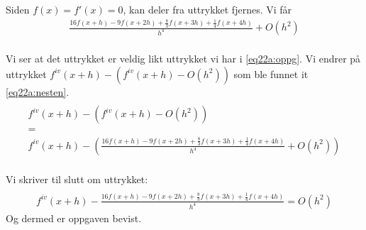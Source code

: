 
Siden $f(x) = f'(x) = 0$, kan deler fra uttrykket fjernes. Vi får
\begin{multline}
\frac{16f(x+h)-9f(x+2h)+\frac{8}{3}f(x+3h)+\frac{1}{4}f(x+4h)}{h^4}+O(h^2) \label{eq22a:nesten} \\
\end{multline}

Vi ser at det uttrykket er veldig likt uttrykket vi har i \ref{eq22a:oppg}. Vi endrer på uttrykket ${f^{iv}}(x + h) - ({f^{iv}}(x + h) - O(h^2))$ som ble funnet it \ref{eq22a:nesten}. 
\begin{multline}
\\ {f^{iv}}(x + h) - ({f^{iv}}(x + h) - O(h^2))  \\
= \\
{f^{iv}}(x + h) - (\frac{16f(x+h)-9f(x+2h)+\frac{8}{3}f(x+3h)+\frac{1}{4}f(x+4h)}{h^4}+O(h^2)) \\ \nonumber
\end{multline}


Vi skriver til slutt om uttrykket:
\begin{multline}
\\ {f^{iv}}(x + h) - \frac{16f(x+h)-9f(x+2h)+\frac{8}{3}f(x+3h)+\frac{1}{4}f(x+4h)}{h^4} = O(h^2) \label{eq22a:ferdig}
\end{multline}
Og dermed er oppgaven bevist. 





